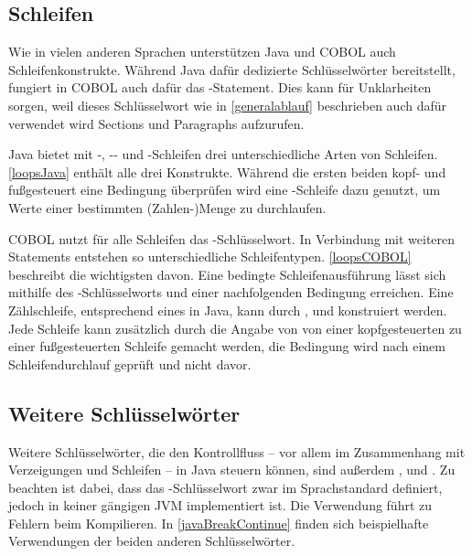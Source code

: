 \subsection{Schleifen}

Wie in vielen anderen Sprachen unterstützen Java und COBOL auch Schleifenkonstrukte. Während Java dafür dedizierte Schlüsselwörter bereitstellt, fungiert in COBOL auch dafür das -Statement. Dies kann für Unklarheiten sorgen, weil dieses Schlüsselwort wie in \autoref{generalablauf} beschrieben auch dafür verwendet wird Sections und Paragraphs aufzurufen.

Java bietet mit -, -- und -Schleifen drei unterschiedliche Arten von Schleifen. \autoref{loopsJava} enthält alle drei Konstrukte. Während die ersten beiden kopf- und fußgesteuert eine Bedingung überprüfen wird eine -Schleife \idR dazu genutzt, um Werte einer bestimmten (Zahlen-)Menge zu durchlaufen.


COBOL nutzt für alle Schleifen das -Schlüsselwort. In Verbindung mit weiteren Statements entstehen so unterschiedliche Schleifentypen. \autoref{loopsCOBOL} beschreibt die wichtigsten davon. Eine bedingte Schleifenausführung lässt sich mithilfe des -Schlüsselworts und einer nachfolgenden Bedingung erreichen. Eine Zählschleife, entsprechend eines  in Java, kann durch ,  und  konstruiert werden. Jede Schleife kann zusätzlich durch die Angabe von  von einer kopfgesteuerten zu einer fußgesteuerten Schleife gemacht werden, \dahe die Bedingung wird nach einem Schleifendurchlauf geprüft und nicht davor.


\subsection{Weitere Schlüsselwörter}

Weitere Schlüsselwörter, die den Kontrollfluss -- vor allem im Zusammenhang mit Verzeigungen und Schleifen -- in Java steuern können, sind außerdem ,  und . Zu beachten ist dabei, dass das -Schlüsselwort zwar im Sprachstandard definiert, jedoch in keiner gängigen JVM implementiert ist. Die Verwendung führt zu Fehlern beim Kompilieren. In \autoref{javaBreakContinue} finden sich beispielhafte Verwendungen der beiden anderen Schlüsselwörter.

